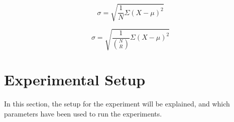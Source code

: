 \begin{equation}
\label{eq:sd}
\sigma =  \sqrt{\frac{1}{N}\Sigma(X-\mu)^2}
\end{equation}

\begin{equation}
\label{eq:sd2}
\sigma =  \sqrt{\frac{1}{{N \choose R}}\Sigma(X-\mu)^2}
\end{equation}


\section{Experimental Setup}
\label{sec:experimentalSetup}
In this section, the setup for the experiment will be explained, and which parameters have been used to run the experiments. 

